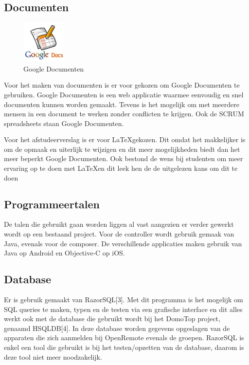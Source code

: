\documentclass[]{article}
\begin{document}
\subsection{Documenten}

\begin{figure}
  \begin{center}
    \includegraphics[width=0.20\textwidth]{docs.pdf}
  \end{center}
  \caption{Google Documenten}
\end{figure}
Voor het maken van documenten is er voor gekozen om Google Documenten te
gebruiken. Google Documenten is een web applicatie waarmee eenvoudig en
snel documenten kunnen worden gemaakt. Tevens is het mogelijk om met
meerdere mensen in een document te werken zonder conflicten te krijgen. Ook
de SCRUM spreadsheets staan Google Documenten.

Voor het afstudeerverslag is er voor \LaTeX\space gekozen. Dit omdat het
makkelijker is om de opmaak en uiterlijk te wijzigen en dit meer mogelijkheden
biedt dan het meer beperkt Google Documenten. Ook bestond de wens bij studenten
om meer ervaring op te doen met \LaTeX\space en dit leek hen de de uitgelezen kans om
dit te doen

\subsection{Programmeertalen}
De talen die gebruikt gaan worden liggen al vast aangezien er verder 
gewerkt wordt op een bestaand project. Voor de controller wordt gebruik gemaak van
Java, evenals voor de composer. De verschillende applicaties maken gebruik
van Java op Android en Objective-C op iOS.

\newpage
\subsection{Database}
Er is gebruik gemaakt van RazorSQL[3]. Met dit programma is het mogelijk om
SQL queries te maken, typen en de testen via een grafische interface en dit
alles werkt ook met de database die gebruikt wordt bij het DomoTop project,
genaamd HSQLDB[4]. In deze database worden gegevens opgeslagen van de
apparaten die zich aanmelden bij OpenRemote evenals de groepen.
RazorSQL is enkel een tool die gebruikt is bij het
testen/opzetten van de database, daarom is deze tool niet meer
noodzakelijk.
\end{document}
